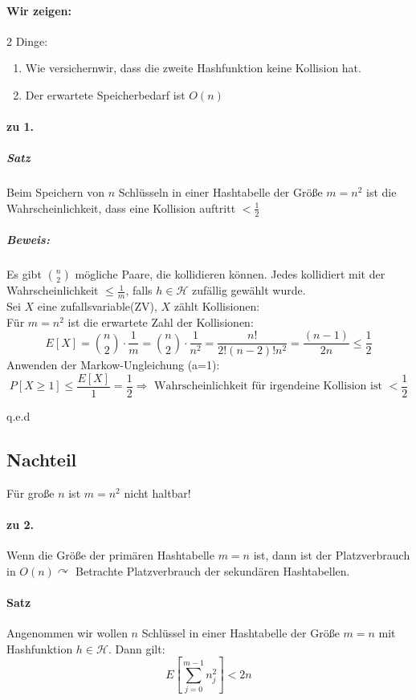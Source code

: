 \paragraph{Wir zeigen:} 2 Dinge:
\begin{enumerate}
	\item Wie versichernwir, dass die zweite Hashfunktion keine Kollision hat.
	\item Der erwartete Speicherbedarf ist $O(n)$
\end{enumerate}
\paragraph{zu 1.}
\subparagraph{Satz}
Beim Speichern von $n$ Schlüsseln in einer Hashtabelle der Größe $m=n^2$ ist die Wahrscheinlichkeit, dass eine Kollision auftritt $<\frac{1}{2}$
\subparagraph{Beweis:}
Es gibt $\binom{n}{2}$ mögliche Paare, die kollidieren können. Jedes kollidiert mit der Wahrscheinlichkeit $\leq \frac{1}{m}$, falls $h\in\mathcal{H}$ zufällig gewählt wurde.\\
Sei $X$ eine zufallsvariable(ZV), $X$ zählt Kollisionen:\\
Für $m=n^2$ ist die erwartete Zahl der Kollisionen:
\[ E[X]=\binom{n}{2}\cdot\frac{1}{m}=\binom{n}{2}\cdot\frac{1}{n^2}=\frac{n!}{2!(n-2)!n^2}=\frac{(n-1)}{2n}\leq\frac{1}{2} \]
Anwenden der Markow-Ungleichung (a=1):
\[ P[X\geq 1]\leq \frac{E[X]}{1}=\frac{1}{2} \Rightarrow \text{ Wahrscheinlichkeit für irgendeine Kollision ist } <\frac{1}{2} \]
\begin{flushright}
	q.e.d
	\end{flushright}
\subsection{Nachteil}
Für große $n$ ist $m=n^2$ nicht haltbar!
\paragraph{zu 2.}
Wenn die Größe der primären Hashtabelle $m=n$ ist, dann ist der Platzverbrauch in $O(n) \curvearrowright$ Betrachte Platzverbrauch der sekundären Hashtabellen.
\paragraph{Satz}
Angenommen wir wollen $n$ Schlüssel in einer Hashtabelle der Größe $m=n$ mit Hashfunktion $h\in \mathcal{H}$. Dann gilt:
\[ E\left[ \sum_{j=0}^{m-1} n_j^2 \right] <2n\]
